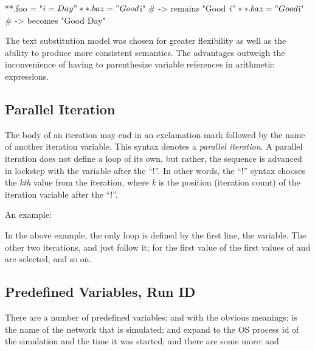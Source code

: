 \begin{inifile}
**.foo = "${i=Day}"
**.baz = "Good $i"     # -> remains "Good $i"
**.baz = "Good ${i}"   # -> becomes "Good Day"
\end{inifile}

\begin{rationale}
The text substitution model was chosen for greater flexibility as well as
the ability to produce more consistent semantics. The advantages outweigh
the inconvenience of having to parenthesize variable references in
arithmetic expressions.
\end{rationale}


\subsection{Parallel Iteration}
\label{sec:config-sim:parallel-iteration}

The body of an iteration may end in an exclamation mark followed by the
name of another iteration variable. This syntax denotes a \textit{parallel
iteration}. A parallel iteration does not define a loop of its own, but
rather, the sequence is advanced in lockstep with the variable after the
“!”. In other words, the “!” syntax chooses the \textit{kth} value from
the iteration, where \textit{k} is the position (iteration count) of the
iteration variable after the “!”.

An example:


In the above example, the only loop is defined by the first line, the 
variable. The other two iterations,  and  just follow it;
for the first value of  the first values of  and 
are selected, and so on.


\subsection{Predefined Variables, Run ID}
\label{sec:config-sim:predefined-variables}

There are a number of predefined variables:  and
 with the obvious meanings;  is the
name of the network that is simulated;  and
 expand to the OS process id of the simulation and the
time it was started; and there are some more: 
 and 

